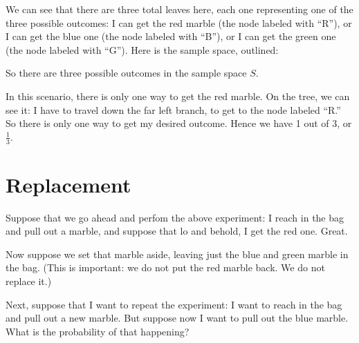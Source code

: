 \documentclass[../../../main.tex]{subfiles}
\begin{document}
\noindent
We can see that there are three total leaves here, each one representing one of the three possible outcomes: I can get the red marble (the node labeled with ``R''), or I can get the blue one (the node labeled with ``B''), or I can get the green one (the node labeled with ``G''). Here is the sample space, outlined:

\begin{center}
\end{center}

\noindent
So there are three possible outcomes in the sample space $S$.

In this scenario, there is only one way to get the red marble. On the tree, we can see it: I have to travel down the far left branch, to get to the node labeled ``R.'' So there is only one way to get my desired outcome. Hence we have 1 out of 3, or $\frac{1}{3}$.


\section{Replacement}

Suppose that we go ahead and perfom the above experiment: I reach in the bag and pull out a marble, and suppose that lo and behold, I get the red one. Great. 

Now suppose we set that marble aside, leaving just the blue and green marble in the bag. (This is important: we do not put the red marble back. We do not replace it.)

Next, suppose that I want to repeat the experiment: I want to reach in the bag and pull out a new marble. But suppose now I want to pull out the blue marble. What is the probability of that happening? 
\end{document}
